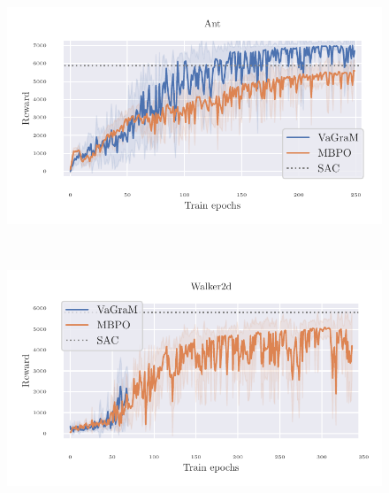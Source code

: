 \begin{figure}[t]
\begin{center}
\begin{minipage}{.49\textwidth}
    \centering
    \includegraphics[width=\textwidth]{figures/vagram/ant.pdf}
\end{minipage}~
\begin{minipage}{.49\textwidth}
    \centering
    \includegraphics[width=\textwidth]{figures/vagram/walker.pdf}
\end{minipage}
\end{center}


\end{figure}
